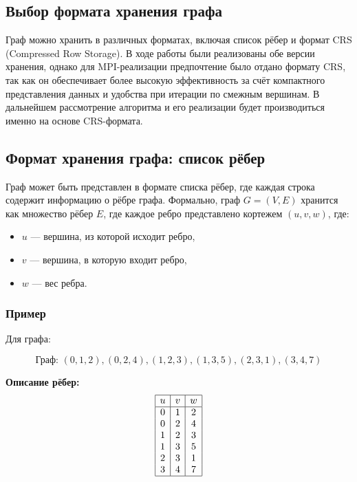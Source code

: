 \documentclass[12pt]{article}
\begin{document}
\subsection{Выбор формата хранения графа}

Граф можно хранить в различных форматах, включая список рёбер и формат CRS (Compressed Row Storage). В ходе работы были реализованы обе версии хранения, однако для MPI-реализации предпочтение было отдано формату CRS, так как он обеспечивает более высокую эффективность за счёт компактного представления данных и удобства при итерации по смежным вершинам. В дальнейшем рассмотрение алгоритма и его реализации будет производиться именно на основе CRS-формата.


\subsection{Формат хранения графа: список рёбер}

Граф может быть представлен в формате списка рёбер, где каждая строка содержит информацию о рёбре графа. Формально, граф \( G = (V, E) \) хранится как множество рёбер \( E \), где каждое ребро представлено кортежем \((u, v, w)\), где:
\begin{itemize}
    \item \( u \) — вершина, из которой исходит ребро,
    \item \( v \) — вершина, в которую входит ребро,
    \item \( w \) — вес ребра.
\end{itemize}

\subsubsection{Пример}

Для графа:

\[
\text{Граф: } (0,1,2), (0,2,4), (1,2,3), (1,3,5), (2,3,1), (3,4,7)
\]

\textbf{Описание рёбер:}
\[
\begin{array}{|c|c|c|}
\hline
u & v & w \\
\hline
0 & 1 & 2 \\
0 & 2 & 4 \\
1 & 2 & 3 \\
1 & 3 & 5 \\
2 & 3 & 1 \\
3 & 4 & 7 \\
\hline
\end{array}
\]
\end{document}
